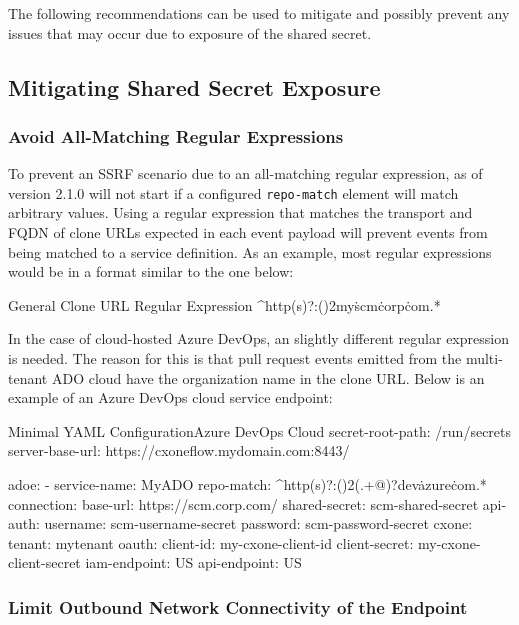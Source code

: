 The following recommendations can be used to mitigate and possibly prevent any
issues that may occur due to exposure of the shared secret.

\subsection{Mitigating Shared Secret Exposure}


\subsubsection{Avoid All-Matching Regular Expressions}

To prevent an SSRF scenario due to an all-matching regular expression, 
\cxoneflow as of version 2.1.0 will not start if a configured \texttt{repo-match} element
will match arbitrary values. Using a regular expression that matches the transport and FQDN
of clone URLs expected in each event payload will prevent events from being matched to a 
service definition.  As an example, most regular expressions would be in a format similar to the one below:

\begin{code}{General Clone URL Regular Expression}{}{}
^http(s)?:(\/){2}my\.scm\.corp\.com.*
\end{code}

In the case of cloud-hosted Azure DevOps, an slightly different regular expression
is needed.  The reason for this is that pull request events emitted from the multi-tenant ADO cloud have
the organization name in the clone URL.  Below is an example of an Azure DevOps cloud
service endpoint:

\begin{code}{Minimal YAML Configuration}{Azure DevOps Cloud}{}
  secret-root-path: /run/secrets
  server-base-url: https://cxoneflow.mydomain.com:8443/
  
  adoe:
      - service-name: MyADO
        repo-match: ^http(s)?:(\/){2}(.+@)?dev\.azure\.com.*
        connection:
        base-url: https://scm.corp.com/
        shared-secret: scm-shared-secret
        api-auth:
          username: scm-username-secret
          password: scm-password-secret
        cxone:
          tenant: mytenant
          oauth:
            client-id: my-cxone-client-id
            client-secret: my-cxone-client-secret
          iam-endpoint: US
          api-endpoint: US
\end{code}
  
\subsubsection{Limit Outbound Network Connectivity of the \cxoneflowtext\space Endpoint}

